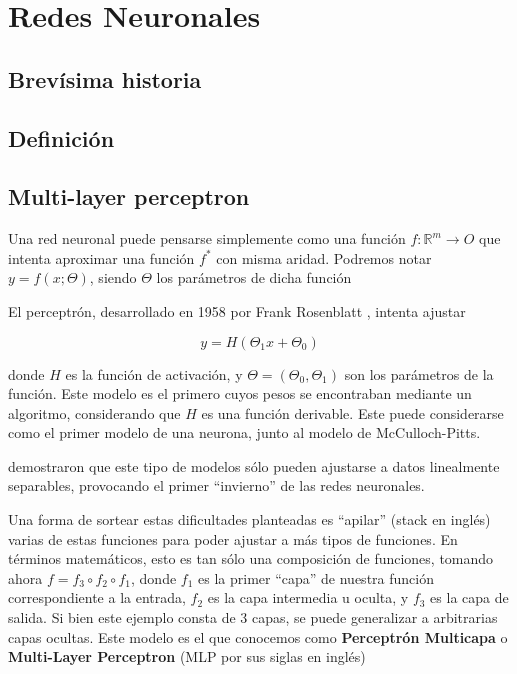 \section{Redes Neuronales}

\subsection{Brevísima historia}
\subsection{Definición}
\subsection{Multi-layer perceptron}

Una red neuronal puede pensarse simplemente como una función $f: \mathbb{R}^m \rightarrow O$ que intenta aproximar una función $f^*$ con misma aridad. Podremos notar $ y = f(x; \Theta)$, siendo $\Theta$ los parámetros de dicha función

El perceptrón, desarrollado en 1958 por Frank Rosenblatt \cite{rosenblatt1958perceptron}, intenta ajustar

\begin{equation*}
    y = H(\Theta_1 x + \Theta_0)
\end{equation*}

donde $H$ es la función de activación, y $\Theta = (\Theta_0, \Theta_1)$ son los parámetros de la función. Este modelo es el primero cuyos pesos se encontraban mediante un algoritmo, considerando que $H$ es una función derivable. Este puede considerarse como el primer modelo de una neurona, junto al modelo de McCulloch-Pitts.

\citet{minsky1969perceptrons} demostraron que este tipo de modelos sólo pueden ajustarse a datos linealmente separables, provocando el primer ``invierno'' de las redes neuronales.

Una forma de sortear estas dificultades planteadas es ``apilar'' (stack en inglés) varias de estas funciones para poder ajustar a más tipos de funciones. En términos matemáticos, esto es tan sólo una composición de funciones, tomando ahora $f = f_3 \circ f_2 \circ f_1$, donde $f_1$ es la primer ``capa'' de nuestra función correspondiente a la entrada, $f_2$ es la capa intermedia u oculta, y $f_3$ es la capa de salida. Si bien este ejemplo consta de 3 capas, se puede generalizar a arbitrarias capas ocultas. Este modelo es el que conocemos como \textbf{Perceptrón Multicapa} o \textbf{Multi-Layer Perceptron} (MLP por sus siglas en inglés)






